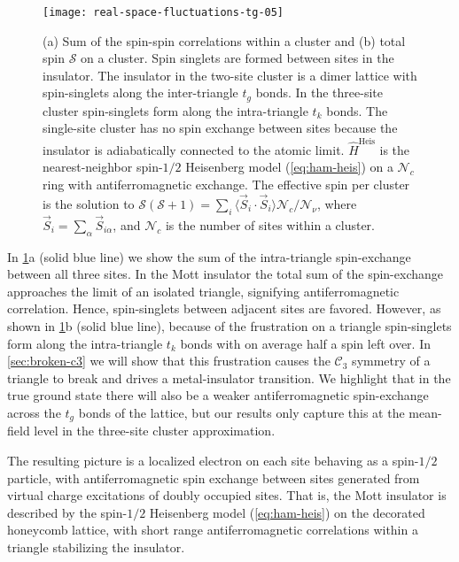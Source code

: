 \documentclass[reprint,aps,prb,amsmath,amssymb]{revtex4-2}
\begin{document}
\begin{figure}
	\centering
	\texttt{[image: real-space-fluctuations-tg-05]}
	\caption
	{\label{fig:para-exchange-s} 
		(a) Sum of the spin-spin correlations within a cluster and (b) total spin $\mathcal{S}$ on a cluster.
		Spin singlets are formed between sites in the insulator. The insulator in the two-site cluster is a dimer lattice with spin-singlets along the inter-triangle $t_g$ bonds. In the three-site cluster spin-singlets form along the intra-triangle $t_k$ bonds. The single-site cluster has no spin exchange between sites because the insulator is adiabatically connected to the atomic limit.
		$\hat{H}^{\textrm{Heis}}$ is the nearest-neighbor spin-$1/2$ Heisenberg model (\cref{eq:ham-heis}) on a $\mathcal{N}_c$ ring with antiferromagnetic exchange.
		The effective spin per cluster is the solution to $\mathcal{S}(\mathcal{S} + 1) = \sum_i \langle \vec{S}_i \cdot \vec{S}_i \rangle \mathcal{N}_c / \mathcal{N}_{\nu}$, where $\vec{S}_i = \sum_{\alpha} \vec{S}_{i\alpha}$, and $\mathcal{N}_c$ is the number of sites within a cluster.
	}
\end{figure}

In \cref{fig:para-exchange-s}a (solid blue line) we show the sum of the intra-triangle spin-exchange between all three sites. In the Mott insulator the total sum of the spin-exchange approaches the limit of an isolated triangle, signifying antiferromagnetic correlation.  Hence, spin-singlets between adjacent sites are favored. However, as shown in \cref{fig:para-exchange-s}b (solid blue line), because of the frustration on a triangle spin-singlets form along the intra-triangle $t_k$ bonds with on average half a spin left over. In \cref{sec:broken-c3} we will show that this frustration causes the $\mathcal{C}_3$ symmetry of a triangle to break and drives a metal-insulator transition. We highlight that in the true ground state there will also be a weaker antiferromagnetic spin-exchange across the $t_g$ bonds of the lattice, but our results only capture this at the mean-field level in the three-site cluster approximation.

The resulting picture is a localized electron on each site  behaving as a spin-$1/2$ particle, with antiferromagnetic spin exchange between sites generated from virtual charge excitations of doubly occupied sites. That is, the Mott insulator is described by the spin-$1/2$ Heisenberg model (\cref{eq:ham-heis}) on the decorated honeycomb lattice, with short range antiferromagnetic correlations within a triangle stabilizing the insulator. 
\end{document}
